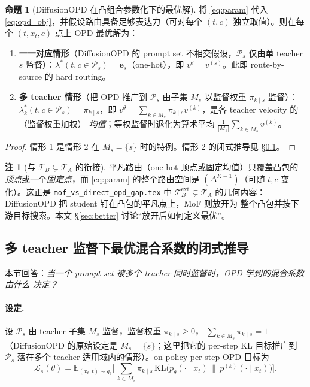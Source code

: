 \documentclass[11pt,a4paper]{article}
\newcommand{\loss}{\mathcal{L}}
\newcommand{\E}{\mathbb{E}}
\newcommand{\KL}{\mathrm{KL}}
\newcommand{\stu}{\theta}
\theoremstyle{definition}
\newtheorem{remark}{注}
\newtheorem{proposition}{命题}
\begin{document}
\begin{proposition}[DiffusionOPD 在凸组合参数化下的最优解]
\label{prop:trivial}
将 \eqref{eq:param} 代入 \eqref{eq:opd_obj}，并假设路由具备足够表达力（可对每个
$(t,c)$ 独立取值）。则在每个 $(t,x_t,c)$ 点上 OPD 最优解为：
\begin{enumerate}[leftmargin=1.5em]
\item \textbf{一一对应情形}（DiffusionOPD 的 prompt set 不相交假设，$\mathcal{P}_s$
仅由单 teacher $s$ 监督）：$\lambda^*(t,c\in\mathcal{P}_s)=\bm{e}_s$（one-hot），即
$v^\stu=v^{(s)}$。此即 route-by-source 的 hard routing。
\item \textbf{多 teacher 情形}（把 OPD 推广到 $\mathcal{P}_s$ 由子集 $M_s$ 以监督权重
$\pi_{k\mid s}$ 监督）：$\lambda^*_k(t,c\in\mathcal{P}_s)=\pi_{k\mid s}$，即
$v^\stu=\sum_{k\in M_s}\pi_{k\mid s}v^{(k)}$，是各 teacher velocity 的（监督权重加权）
\emph{均值}；等权监督时退化为算术平均 $\tfrac{1}{|M_s|}\sum_{k\in M_s}v^{(k)}$。
\end{enumerate}
\end{proposition}

\begin{proof}
情形 1 是情形 2 在 $M_s=\{s\}$ 时的特例。情形 2 的闭式推导见 \S\ref{ssec:multi}。
\end{proof}

\begin{remark}[与 $\mathcal{T}_B\subsetneq\mathcal{T}_A$ 的衔接]
平凡路由（one-hot 顶点或固定均值）只覆盖凸包的\emph{顶点}或一个\emph{固定点}，而
\eqref{eq:param} 的整个路由空间是 $(\Delta^{K-1})$（可随 $t,c$ 变化）。这正是
\texttt{mof\_vs\_direct\_opd\_gap.tex} 中 $\mathcal{T}_B^{\text{ext}}\subsetneq
\mathcal{T}_A$ 的几何内容：DiffusionOPD 把 student 钉在凸包的平凡点上，MoF 则放开为
整个凸包并按下游目标搜索。本文 \S\ref{sec:better} 讨论``放开后如何定义最优''。
\end{remark}

\subsection{多 teacher 监督下最优混合系数的闭式推导}
\label{ssec:multi}

本节回答：\emph{当一个 prompt set 被多个 teacher 同时监督时，OPD 学到的混合系数由什么
决定？}

\paragraph{设定.}
设 $\mathcal{P}_s$ 由 teacher 子集 $M_s$ 监督，监督权重 $\pi_{k\mid s}\ge0$，
$\sum_{k\in M_s}\pi_{k\mid s}=1$（DiffusionOPD 的原始设定是 $M_s=\{s\}$；这里把它的
per-step KL 目标推广到 $\mathcal{P}_s$ 落在多个 teacher 适用域内的情形）。on-policy
per-step OPD 目标为
\begin{equation}
\loss_s(\theta)=\E_{(x_t,t)\sim q_\theta}\!\Big[\,
\sum_{k\in M_s}\pi_{k\mid s}\,
\KL\!\big(p_\theta(\cdot\mid x_t)\,\big\|\,p^{(k)}(\cdot\mid x_t)\big)\Big].
\label{eq:multi_obj}
\end{equation}
\end{document}
